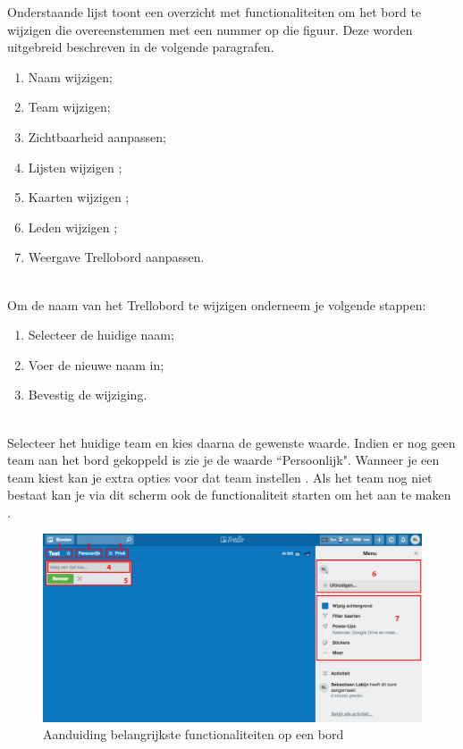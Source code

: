 Onderstaande lijst toont een overzicht met functionaliteiten  om het bord te wijzigen die overeenstemmen met een nummer op die figuur. Deze worden uitgebreid beschreven in de volgende paragrafen.

\begin{enumerate}[nolistsep]
	\item Naam wijzigen;
	\item Team wijzigen;
	\item Zichtbaarheid aanpassen;
	\item Lijsten wijzigen ;
	\item Kaarten wijzigen ;
	\item Leden wijzigen  ;
	\item Weergave Trellobord aanpassen.
\end{enumerate}

\noindent
\\Om de naam van het Trellobord te wijzigen onderneem je volgende stappen:
\begin{enumerate}[nolistsep]
	\item Selecteer de huidige naam;
	\item Voer de nieuwe naam in;
	\item Bevestig de wijziging.
\end{enumerate}	

\noindent
\\Selecteer het huidige team en kies daarna de gewenste waarde. Indien er nog geen team aan het bord gekoppeld is zie je de waarde ``Persoonlijk". Wanneer je een team kiest kan je extra opties voor dat team instellen . Als het team nog niet bestaat kan je via dit scherm ook de functionaliteit starten om het aan te maken .

\begin{figure}[H]
	\centering
	\includegraphics[width=\textwidth]{./afbeeldingen/leeg_bord_genummerd.png}
	\caption{Aanduiding belangrijkste functionaliteiten op een bord}
	\label{fig:leeg_bord_genummerd}	
\end{figure} 

